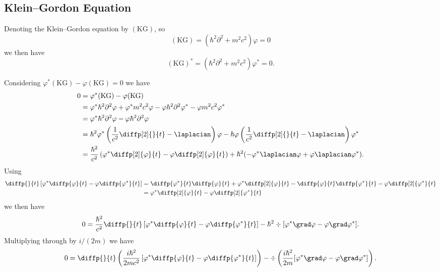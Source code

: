 \documentclass[fleqn]{NotesClass}
\newcommand*{\dalembertian}{\partial^2}
\begin{document}
    \subsection{Klein--Gordon Equation}
    Denoting the Klein--Gordon equation by \((\mathrm{KG})\), so
    \begin{equation}
        (\mathrm{KG}) = (\hbar^2\dalembertian + m^2c^2)\varphi = 0
    \end{equation}
    we then have
    \begin{equation}
        (\mathrm{KG})^* = (\hbar^2\dalembertian + m^2c^2)\varphi^* = 0.
    \end{equation}
    
    Considering \(\varphi^*(\mathrm{KG}) - \varphi(\mathrm{KG}) = 0\) we have
    \begin{align}
        0 &= \varphi^*(\mathrm{KG}) - \varphi(\mathrm{KG})\\
        &= \varphi^*\hbar^2\dalembertian\varphi + \varphi^*m^2c^2\varphi - \varphi\hbar^2\dalembertian\varphi^* - \varphi m^2c^2\varphi^*\\
        &= \varphi^*\hbar^2\dalembertian\varphi - \varphi\hbar^2\dalembertian\varphi\\
        &= \hbar^2\varphi^*\left( \frac{1}{c^2}\diffp[2]{}{t} - \laplacian \right)\varphi - \hbar\varphi\left( \frac{1}{c^2}\diffp[2]{}{t} - \laplacian \right)\varphi^*\\
        &= \frac{\hbar^2}{c^2}\left( \varphi^*\diffp[2]{\varphi}{t} - \varphi\diffp[2]{\varphi}{t} \right) + \hbar^2(-\varphi^*\laplacian\varphi + \varphi\laplacian\varphi^*).
    \end{align}
    Using
    \begin{align}
        \diffp{}{t} \left[ \varphi^*\diffp{\varphi}{t} - \varphi\diffp{\varphi^*}{t} \right] &= \diffp{\varphi^*}{t}\diffp{\varphi}{t} + \varphi^*\diffp[2]{\varphi}{t} - \diffp{\varphi}{t}\diffp{\varphi^*}{t} - \varphi\diffp[2]{\varphi^*}{t}\\
        &= \varphi^*\diffp[2]{\varphi}{t} - \varphi\diffp[2]{\varphi^*}{t}
    \end{align}
    we then have
    \begin{equation}
        0 = \frac{\hbar^2}{c^2} \diffp{}{t}\left[ \varphi^*\diffp{\varphi}{t} - \varphi\diffp{\varphi^*}{t} \right] - \hbar^2 \div[\varphi^*\grad\varphi - \varphi\grad\varphi^*].
    \end{equation}
    Multiplying through by \(i/(2m)\) we have
    \begin{equation}
        0 = \diffp{}{t}\left( \frac{i\hbar^2}{2mc^2} \left[ \varphi^*\diffp{\varphi}{t} - \varphi\diffp{\varphi^*}{t} \right] \right) - \div \left( \frac{i\hbar^2}{2m} [\varphi^*\grad\varphi - \varphi\grad\varphi^*] \right).
    \end{equation}
\end{document}
